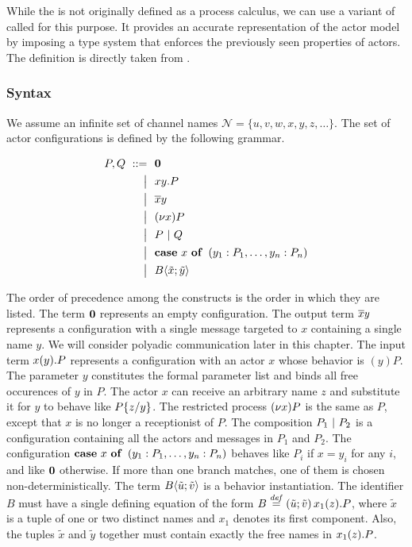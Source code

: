 While the \actormodel is not originally defined as a process calculus,
we can use a variant of \picalc called \actorpicalc for this purpose.
It provides an accurate representation of the actor model
by imposing a type system that enforces the previously seen properties of actors.
The definition is directly taken from \cite{agha_algebraic_2004}.

\subsubsection{Syntax}

We assume an infinite set of channel names
$ \mathcal{N} = \{u, v, w, x, y, z, \ldots\} $.
The set of actor configurations is defined by the following grammar.

\begin{align*}
  P, Q
  \grmr \anullproc
  \altn \amrcv{x}{y} . P
  \altn \amsnd{x}{y}
  \altn \anew{x}{P}
  \altn P \apar Q
  \altn \acse{x}{\aalt{y_1}{P_1}, \dots, \aalt{y_n}{P_n}}
  \altn \ains{B}{\tilde{x}}{\tilde{y}}
\end{align*}

The order of precedence among the constructs is the order in which they are
listed.
The term $\textbf{\textup{0}}$ represents an empty configuration.
The output term $\overline{x} y$ represents a configuration with a single message
targeted to $x$ containing a single name $y$. %
We will consider polyadic communication later in this chapter.
The input term $x(y) . P$ represents a configuration with an actor
$x$ whose behavior is $(y) P$.
The parameter $y$ constitutes the formal parameter list and binds all
free occurences of $y$ in $P$.
The actor $x$ can receive an arbitrary name $z$
and substitute it for $y$ to behave like $P \{ z / y \}$.
The restricted process $\anew{x}{P}$ is the same as $P$,
except that $x$ is no longer a receptionist of $P$.
The composition $P_1 \ |\  P_2$ is a configuration containing
all the actors and messages in $P_1$ and $P_2$.
The configuration
$\acse{x}{\aalt{y_1}{P_1}, \ldots, \aalt{y_n}{P_n}}$
behaves like $P_i$ if $x = y_i$ for any $i$,
and like $\textbf{\textup{0}}$ otherwise.
If more than one branch matches, one of them is chosen non-deterministically.
The term $B \langle \tilde{u} ; \tilde{v} \rangle$ is a behavior instantiation.
The identifier $B$ must have a single defining equation of the form
$\adef{B}{\tilde{u}}{\tilde{v}}{\arcv{x_1}{z} . P}$,
where $\tilde{x}$ is a tuple of one or two distinct names
and $x_1$ denotes its first component.
Also, the tuples $\tilde{x}$ and $\tilde{y}$ together must contain
exactly the free names in $x_1(z) . P$.


